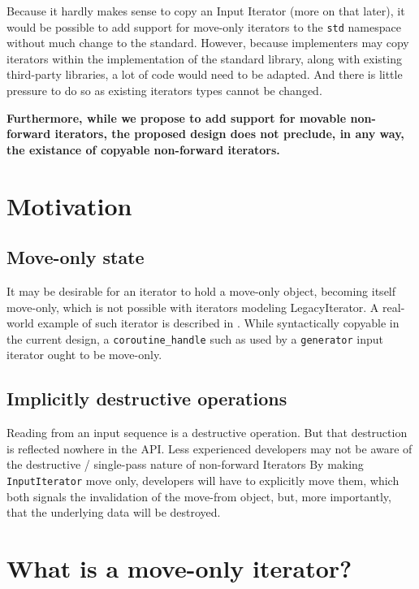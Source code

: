 \documentclass{wg21}
\begin{document}
Because it hardly makes sense to copy an Input Iterator (more on that
later), it would be possible to add support for move-only iterators to
the \texttt{std} namespace without much change to the standard. However,
because implementers may copy iterators within the implementation of the
standard library, along with existing third-party libraries, a lot of
code would need to be adapted. And there is little pressure to do so as
existing iterators types cannot be changed.

\textbf{Furthermore, while we propose to add support for movable
	non-forward iterators, the proposed design does not preclude, in any
	way, the existance of copyable non-forward iterators.}

\hypertarget{motivation}{%
	\section{Motivation}\label{motivation}}

\hypertarget{move-only-state}{%
	\subsection{Move-only state}\label{move-only-state}}

It may be desirable for an iterator to hold a move-only object, becoming
itself move-only, which is not possible with iterators modeling
LegacyIterator. A real-world example of such iterator is described in
\cite{P0902}. While syntactically copyable in the current design,
a \texttt{coroutine\_handle} such as used by a \texttt{generator} input
iterator ought to be move-only.

\hypertarget{implicitly-destructive-operations}{%
	\subsection{Implicitly destructive
		operations}\label{implicitly-destructive-operations}}

Reading from an input sequence is a destructive operation. But that
destruction is reflected nowhere in the API. Less experienced developers
may not be aware of the destructive / single-pass nature of non-forward
Iterators By making \texttt{InputIterator} move only, developers will
have to explicitly move them, which both signals the invalidation of the
move-from object, but, more importantly, that the underlying data will
be destroyed.

\hypertarget{what-is-a-move-only-iterator}{%
	\section{What is a move-only
		iterator?}\label{what-is-a-move-only-iterator}}
\end{document}
